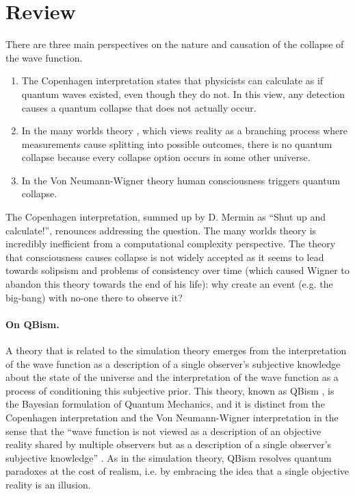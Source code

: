 \documentclass[11pt]{article}
\theoremstyle{definition}
\begin{document}
\section{Review}
There are three main perspectives on the nature and causation of the collapse of the wave function.
\begin{enumerate}
\item The Copenhagen interpretation  \cite{schlosshauer2013snapshot}
 states that physicists can calculate as if quantum waves existed, even though they do not. In this view, any detection causes a quantum collapse that does not actually occur.
\item In the many worlds theory \cite{everett1957relative, dewitt1973many}, which views reality as a branching process where measurements cause splitting into possible outcomes,
 there is no quantum collapse because every collapse option occurs in some other universe.

\item In the	Von Neumann-Wigner theory \cite{von1955mathematical, wigner1967symmetries} human consciousness triggers quantum collapse.

\end{enumerate}

The Copenhagen interpretation, summed up by D. Mermin \cite{mermin1989} as ``Shut up and calculate!'', renounces addressing the question. The many worlds theory is incredibly inefficient from a computational complexity perspective.
The theory that consciousness causes collapse is not widely accepted as it seems to lead towards solipsism  and problems of consistency over time (which caused Wigner to abandon \cite{esfeld1999essay} this theory towards the end of his life):
why create an event (e.g. the big-bang) with no-one there to observe it?

 \paragraph{On QBism.}
A theory that is  related to the simulation theory emerges from the interpretation of the wave function as a  description of a single observer’s subjective knowledge about the state of the universe and the interpretation of the wave function as a process of conditioning this subjective prior. This theory,  known as QBism \cite{mermin2014physics},
 is  the  Bayesian formulation of Quantum Mechanics, and it is
 distinct from the Copenhagen interpretation  \cite{mermin2017qbism} and the 	Von Neumann-Wigner interpretation in the sense that the
  ``wave function is not viewed as a description of an objective reality shared by multiple observers but as a description of a single observer’s subjective knowledge'' \cite{qbismprivate}. As in the simulation theory,
  QBism  resolves quantum paradoxes at the cost of realism, i.e. by embracing the idea that a single objective reality is an illusion.
\end{document}

